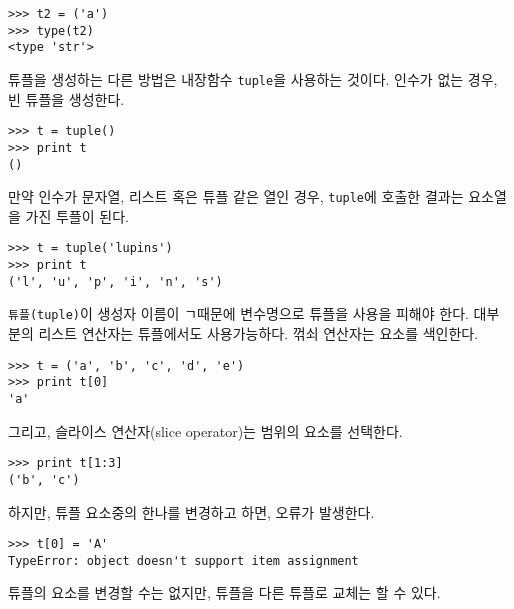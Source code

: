 \beforeverb
\begin{verbatim}
>>> t2 = ('a')
>>> type(t2)
<type 'str'>
\end{verbatim}
\afterverb
%

튜플을 생성하는 다른 방법은 내장함수 {\tt tuple}을 사용하는 것이다. 인수가 없는 경우, 빈 튜플을 생성한다.


\beforeverb
\begin{verbatim}
>>> t = tuple()
>>> print t
()
\end{verbatim}
\afterverb
%

만약 인수가 문자열, 리스트 혹은 튜플 같은 열인 경우, {\tt tuple}에 호출한 결과는 요소열을 가진 투플이 된다.

\beforeverb
\begin{verbatim}
>>> t = tuple('lupins')
>>> print t
('l', 'u', 'p', 'i', 'n', 's')
\end{verbatim}
\afterverb
%

{\tt 튜플(tuple)}이 생성자 이름이 ㄱ때문에 변수명으로 튜플을 사용을 피해야 한다.
대부분의 리스트 연산자는 튜플에서도 사용가능하다. 꺾쇠 연산자는 요소를 색인한다.


\beforeverb
\begin{verbatim}
>>> t = ('a', 'b', 'c', 'd', 'e')
>>> print t[0]
'a'
\end{verbatim}
\afterverb
%

그리고, 슬라이스 연산자(slice operator)는 범위의 요소를 선택한다.


\beforeverb
\begin{verbatim}
>>> print t[1:3]
('b', 'c')
\end{verbatim}
\afterverb
%

하지만, 튜플 요소중의 한나를 변경하고 하면, 오류가 발생한다.


\beforeverb
\begin{verbatim}
>>> t[0] = 'A'
TypeError: object doesn't support item assignment
\end{verbatim}
\afterverb
%

튜플의 요소를 변경할 수는 없지만, 튜플을 다른 튜플로 교체는 할 수 있다.

